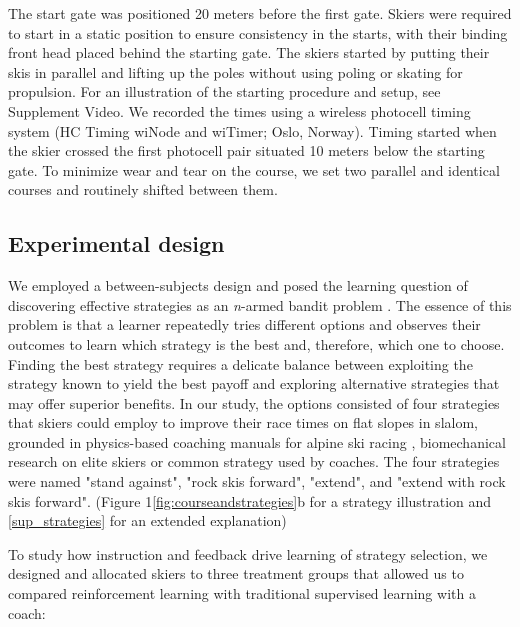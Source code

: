 \documentclass[pdflatex,sn-mathphys-num]{sn-jnl}%
\theoremstyle{thmstyleone}%
\theoremstyle{thmstyletwo}%
\theoremstyle{thmstylethree}%
\begin{document}
The start gate was positioned 20 meters before the first gate. Skiers were required to start in a static position to ensure consistency in the starts, with their binding front head placed behind the starting gate. The skiers started by putting their skis in parallel and lifting up the poles without using poling or skating for propulsion. For an illustration of the starting procedure and setup, see Supplement Video. We recorded the times using a wireless photocell timing system (HC Timing wiNode and wiTimer; Oslo, Norway). Timing started when the skier crossed the first photocell pair situated 10 meters below the starting gate. To minimize wear and tear on the course, we set two parallel and identical courses and routinely shifted between them.
 
\subsection{Experimental design}
We employed a between-subjects design and posed the learning question of discovering effective strategies as an \textit{n}-armed bandit problem \cite{sutton_reinforcement_2018}. The essence of this problem is that a learner repeatedly tries different options and observes their outcomes to learn which strategy is the best and, therefore, which one to choose. Finding the best strategy requires a delicate balance between exploiting the strategy known to yield the best payoff and exploring alternative strategies that may offer superior benefits. In our study, the options consisted of four strategies that skiers could employ to improve their race times on flat slopes in slalom, grounded in physics-based coaching manuals for alpine ski racing \cite{lemaster_skiers_1999, lemaster_ultimate_2010, lind_physics_2013}, biomechanical research on elite skiers \cite{reid_kinematic_2010, tjorhom_beskrivelse_2007, reid_alpine_2020, magelssen_is_2022}  or common strategy used by coaches. The four strategies were named "stand against", "rock skis forward", "extend", and "extend with rock skis forward". (Figure 1\ref{fig:courseandstrategies}b for a strategy illustration and \ref{sup_strategies} for an extended explanation)

To study how instruction and feedback drive learning of strategy selection, we designed and allocated skiers to three treatment groups that allowed us to compared reinforcement learning with traditional supervised learning with a coach:
\end{document}
